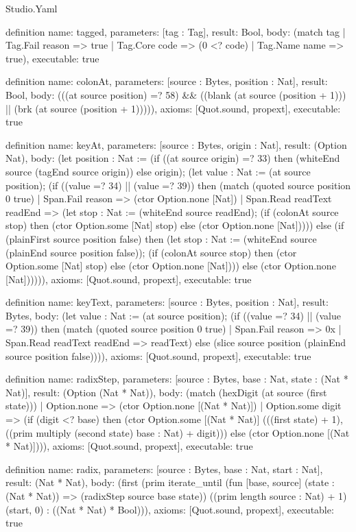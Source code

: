 \begin{lexlean}{Studio.Yaml}
\begin{semanticmodule}
definition{
  name: tagged,
  parameters: [tag : Tag],
  result: Bool,
  body: (match tag
    | Tag.Fail reason => true
    | Tag.Core code => (0 <? code)
    | Tag.Name name => true),
  executable: true
}

definition{
  name: colonAt,
  parameters: [source : Bytes, position : Nat],
  result: Bool,
  body: (((at source position) =? 58) && ((blank (at source (position + 1))) || (brk (at source (position + 1))))),
  axioms: [Quot.sound, propext],
  executable: true
}

definition{
  name: keyAt,
  parameters: [source : Bytes, origin : Nat],
  result: (Option Nat),
  body: (let position : Nat := (if ((at source origin) =? 33) then (whiteEnd source (tagEnd source origin)) else origin); (let value : Nat := (at source position); (if ((value =? 34) || (value =? 39)) then (match (quoted source position 0 true)
    | Span.Fail reason => (ctor Option.none [Nat])
    | Span.Read readText readEnd => (let stop : Nat := (whiteEnd source readEnd); (if (colonAt source stop) then (ctor Option.some [Nat] stop) else (ctor Option.none [Nat])))) else (if (plainFirst source position false) then (let stop : Nat := (whiteEnd source (plainEnd source position false)); (if (colonAt source stop) then (ctor Option.some [Nat] stop) else (ctor Option.none [Nat]))) else (ctor Option.none [Nat]))))),
  axioms: [Quot.sound, propext],
  executable: true
}

definition{
  name: keyText,
  parameters: [source : Bytes, position : Nat],
  result: Bytes,
  body: (let value : Nat := (at source position); (if ((value =? 34) || (value =? 39)) then (match (quoted source position 0 true)
    | Span.Fail reason => 0x
    | Span.Read readText readEnd => readText) else (slice source position (plainEnd source position false)))),
  axioms: [Quot.sound, propext],
  executable: true
}

definition{
  name: radixStep,
  parameters: [source : Bytes, base : Nat, state : (Nat * Nat)],
  result: (Option (Nat * Nat)),
  body: (match (hexDigit (at source (first state)))
    | Option.none => (ctor Option.none [(Nat * Nat)])
    | Option.some digit => (if (digit <? base) then (ctor Option.some [(Nat * Nat)] (((first state) + 1), ((prim multiply (second state) base : Nat) + digit))) else (ctor Option.none [(Nat * Nat)]))),
  axioms: [Quot.sound, propext],
  executable: true
}

definition{
  name: radix,
  parameters: [source : Bytes, base : Nat, start : Nat],
  result: (Nat * Nat),
  body: (first (prim iterate_until (fun [base, source] (state : (Nat * Nat)) => (radixStep source base state)) ((prim length source : Nat) + 1) (start, 0) : ((Nat * Nat) * Bool))),
  axioms: [Quot.sound, propext],
  executable: true
}


\end{semanticmodule}
\end{lexlean}
